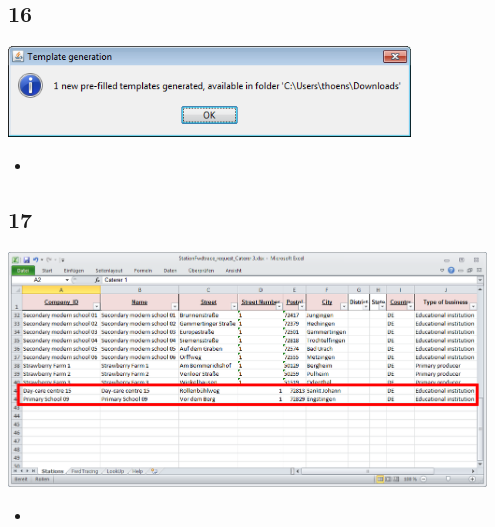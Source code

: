 \documentclass{beamer}
\begin{document}
\subsection{16}
\begin{frame}
	\begin{center}
  		\includegraphics[width=0.8\textwidth]{16.png}
	\end{center}
	\begin{itemize}
		\item
	\end{itemize}
\end{frame}

\subsection{17}
\begin{frame}
	\begin{center}
  		\includegraphics[width=0.95\textwidth]{17.png}
	\end{center}
	\begin{itemize}
		\item
	\end{itemize}
\end{frame}
\end{document}
